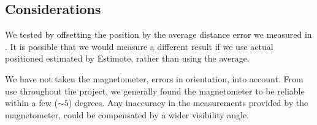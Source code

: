 \subsection{Considerations}
We tested by offsetting the position by the average distance error we measured in .
It is possible that we would measure a different result if we use actual positioned estimated by Estimote,
rather than using the average. 

We have not taken the magnetometer, \ie errors in orientation, into account.
From use throughout the project, 
we generally found the magnetometer to be reliable within a few ($\sim 5$) degrees. 
Any inaccuracy in the measurements provided by the magnetometer, 
could be compensated by a wider visibility angle.

